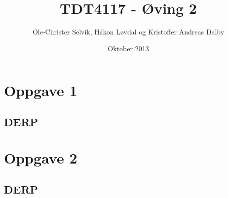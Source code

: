 \documentclass[]{article}
\begin{document}
\title{TDT4117 - Øving 2}
\author{Ole-Christer Selvik, Håkon Løvdal og Kristoffer Andreas Dalby}
\date{Oktober 2013}
\maketitle

\pagebreak

\section{Oppgave 1}
\subsection{DERP}

\pagebreak

\section{Oppgave 2}
\subsection{DERP}

\pagebreak
\end{document}
